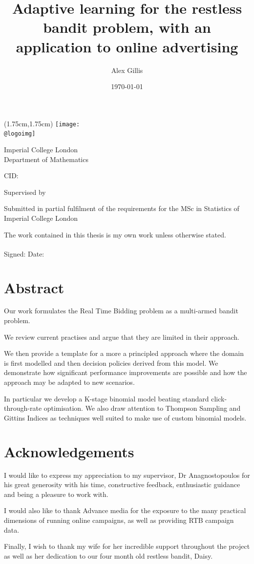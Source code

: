 \documentclass[11pt,a4,singlespacing,titlepagenumber=on]{scrreprt}
\title{Adaptive learning for the restless bandit problem, with an application to online advertising}
\author{Alex Gillis}
\date{\today}
\makeatletter
\numberwithin{equation}{chapter} %
\theoremstyle{remark}
\renewcommand{\maketitle}{
\begin{titlepage}
\ifdefined\@logoimg
\begin{textblock*}{8cm}(1.75cm,1.75cm)
\texttt{[image: \\@logoimg]}
\end{textblock*}
\vspace*{1cm}
\else
\fi
\begin{center}
\vspace*{\stretch{0.1}}
Imperial College London\\
Department of Mathematics\par
\vspace*{\stretch{1}} %
{\titlefont\Huge \@title\par} %
\vspace*{\stretch{2}}
{\Large \@author \par}
\vspace*{1em}
{\large CID: \@CID \par}
\vspace*{\stretch{0.5}}
{\large Supervised by \@supervisor \par}
\vspace*{\stretch{3}}
{\Large \@date \par}
\vspace*{\stretch{1}}
{\large Submitted in partial fulfilment of the requirements for the
MSc in Statistics of Imperial College London}
\vspace*{\stretch{0.1}}
\end{center}%
\end{titlepage}%
}
\newcommand*{\declaration}{%
\vspace*{0.3\textheight}
The work contained in this thesis is my own work unless
otherwise stated.\\
\vspace*{0.1\textheight}\\
\hspace*{0.25\textwidth}Signed: \hspace{0.25\textwidth} Date:
\clearpage}
\renewenvironment{abstract}%
{\chapter*{Abstract}\thispagestyle{plain}}%
{\clearpage}
\makeatother
\begin{document}
\maketitle %

\declaration %

\begin{abstract}

Our work formulates the Real Time Bidding problem as a multi-armed bandit problem.

We review current practises and argue that they are limited in their approach. 

We then provide a template for a more a principled approach where the domain is first modelled and then decision policies derived from this model. We demonstrate how significant performance improvements are possible and how the approach may be adapted to new scenarios.
 
In particular we develop a K-stage binomial model beating standard click-through-rate optimisation. We also draw attention to Thompson Sampling and Gittins Indices as techniques well suited to make use of custom binomial models.

\end{abstract}

\newpage
\chapter*{Acknowledgements}

I would like to express my appreciation to my supervisor, Dr Anagnostopoulos for his great generosity with his time, constructive feedback, enthusiastic guidance and being a pleasure to work with.

I would also like to thank Advance media for the exposure to the many practical dimensions of running online campaigns, as well as providing RTB campaign data. 

Finally, I wish to thank my wife for her incredible support throughout the project as well as her dedication to our four month old restless bandit, Daisy.

\newpage

\renewcommand{\contentsname}{Table of Contents}
\tableofcontents
\newpage

\listoffigures 
\end{document}
